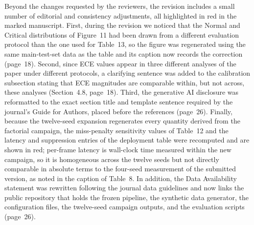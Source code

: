 \documentclass[1p,12pt,authoryear]{elsarticle}
\begin{document}
\noindent Beyond the changes requested by the reviewers, the revision includes a small number of editorial and consistency adjustments, all highlighted in red in the marked manuscript. First, during the revision we noticed that the Normal and Critical distributions of Figure~11 had been drawn from a different evaluation protocol than the one used for Table~13, so the figure was regenerated using the same main-test-set data as the table and its caption now records the correction (page~18). Second, since ECE values appear in three different analyses of the paper under different protocols, a clarifying sentence was added to the calibration subsection stating that ECE magnitudes are comparable within, but not across, these analyses (Section~4.8, page~18). Third, the generative AI disclosure was reformatted to the exact section title and template sentence required by the journal's Guide for Authors, placed before the references (page~26). Finally, because the twelve-seed expansion regenerates every quantity derived from the factorial campaign, the miss-penalty sensitivity values of Table~12 and the latency and suppression entries of the deployment table were recomputed and are shown in red; per-frame latency is wall-clock time measured within the new campaign, so it is homogeneous across the twelve seeds but not directly comparable in absolute terms to the four-seed measurement of the submitted version, as noted in the caption of Table~8. In addition, the Data Availability statement was rewritten following the journal data guidelines and now links the public repository that holds the frozen pipeline, the synthetic data generator, the configuration files, the twelve-seed campaign outputs, and the evaluation scripts (page~26).
\end{document}
